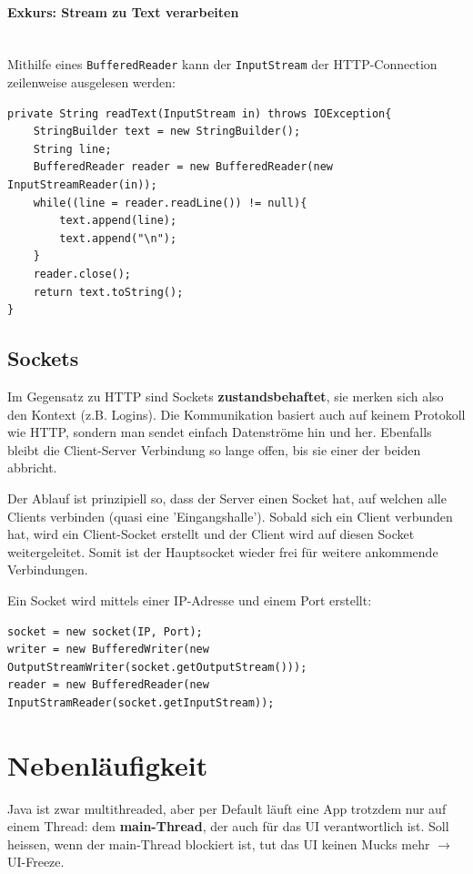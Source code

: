 \documentclass[a4paper, 11pt]{article}
\newcommand{\code}[1]{\texttt{#1}}
\begin{document}
\paragraph{Exkurs: Stream zu Text verarbeiten}\mbox{}\\
Mithilfe eines \code{BufferedReader} kann der \code{InputStream} der HTTP-Connection zeilenweise ausgelesen werden:

\begin{lstlisting}[caption={}]
private String readText(InputStream in) throws IOException{
	StringBuilder text = new StringBuilder();
	String line;
	BufferedReader reader = new BufferedReader(new InputStreamReader(in));
	while((line = reader.readLine()) != null){
		text.append(line);
		text.append("\n");
	}
	reader.close();
	return text.toString();
}
\end{lstlisting}

\subsection{Sockets}
Im Gegensatz zu HTTP sind Sockets \textbf{zustandsbehaftet}, sie merken sich also den Kontext (z.B. Logins). Die Kommunikation basiert auch auf keinem Protokoll wie HTTP, sondern man sendet einfach Datenströme hin und her. Ebenfalls bleibt die Client-Server Verbindung so lange offen, bis sie einer der beiden abbricht.
\vspace{10px}

\noindent Der Ablauf ist prinzipiell so, dass der Server einen Socket hat, auf welchen alle Clients verbinden (quasi eine 'Eingangshalle'). Sobald sich ein Client verbunden hat, wird ein Client-Socket erstellt und der Client wird auf diesen Socket weitergeleitet. Somit ist der Hauptsocket wieder frei für weitere ankommende Verbindungen. 
\vspace{10px}

\noindent Ein Socket wird mittels einer IP-Adresse und einem Port erstellt:

\begin{lstlisting}[caption={Erstellung eines Sockets und dessen Reader/Writer}]
socket = new socket(IP, Port);
writer = new BufferedWriter(new OutputStreamWriter(socket.getOutputStream()));
reader = new BufferedReader(new InputStramReader(socket.getInputStream));
\end{lstlisting}

\section{Nebenläufigkeit}
Java ist zwar multithreaded, aber per Default läuft eine App trotzdem nur auf einem Thread: dem \textbf{main-Thread}, der auch für das UI verantwortlich ist. Soll heissen, wenn der main-Thread blockiert ist, tut das UI keinen Mucks mehr $\rightarrow$ UI-Freeze.
\end{document}
